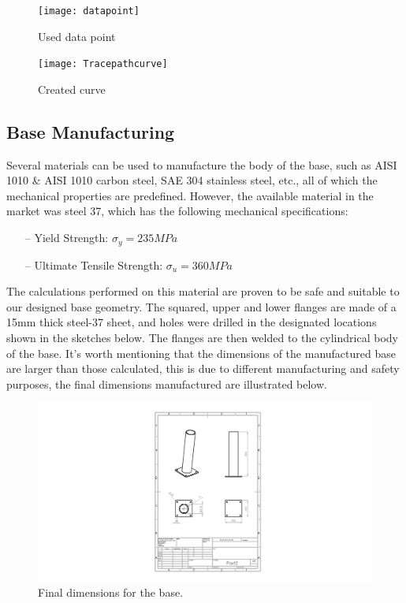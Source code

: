 \begin{figure}[H]
	\centering
	\texttt{[image: datapoint]}
	\caption{Used data point}
\end{figure}

\begin{figure}[H]
	\centering
	\texttt{[image: Tracepathcurve]}
	\caption{Created curve}
\end{figure}


\subsection{Base Manufacturing}


Several materials can be used to manufacture the body of the base, such as AISI 1010 \& AISI 1010 carbon steel, SAE 304 stainless steel, etc., all of which the mechanical properties are predefined. However, the available material in the market was steel 37, which has the following mechanical specifications:

\begin{itemize}
	\item[--] Yield Strength: $\sigma_{y} = 235 MPa$
	\item[--] Ultimate Tensile Strength: $\sigma_{u} = 360 MPa$
\end{itemize}


The calculations performed on this material are proven to be safe and suitable to our designed base geometry. 
\newline The squared, upper and lower flanges are made of a 15mm thick steel-37 sheet, and holes were drilled in the designated locations shown in the sketches below. The flanges are then welded to the cylindrical body of the base. It’s worth mentioning that the dimensions of the manufactured base are larger than those calculated, this is due to different manufacturing and safety purposes, the final dimensions manufactured are illustrated below.
\begin{figure}[H]
	\begin{center}
		\includegraphics[scale=1]{BaseDim}
		\caption{Final dimensions for the base.}
	\end{center}
\end{figure}

